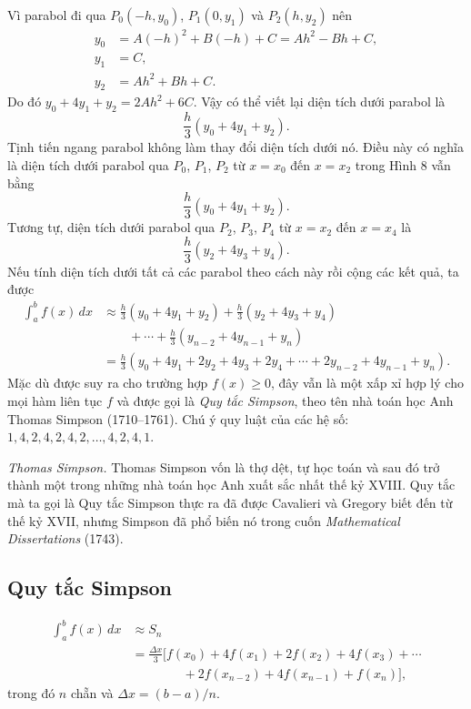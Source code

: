 \documentclass[12pt,a4paper]{article}
\begin{document}
Vì parabol đi qua $P_0(-h,y_0)$, $P_1(0,y_1)$ và $P_2(h,y_2)$ nên
\begin{align*}
y_0&=A(-h)^2+B(-h)+C=Ah^2-Bh+C,\\
y_1&=C,\\
y_2&=Ah^2+Bh+C.
\end{align*}
Do đó $y_0+4y_1+y_2=2Ah^2+6C$. Vậy có thể viết lại diện tích dưới parabol là
\[\frac h3(y_0+4y_1+y_2).\]
Tịnh tiến ngang parabol không làm thay đổi diện tích dưới nó. Điều này có nghĩa là diện tích dưới parabol qua $P_0$, $P_1$, $P_2$ từ $x=x_0$ đến $x=x_2$ trong Hình 8 vẫn bằng
\[\frac h3(y_0+4y_1+y_2).\]
Tương tự, diện tích dưới parabol qua $P_2$, $P_3$, $P_4$ từ $x=x_2$ đến $x=x_4$ là
\[\frac h3(y_2+4y_3+y_4).\]
Nếu tính diện tích dưới tất cả các parabol theo cách này rồi cộng các kết quả, ta được
\begin{align*}
\int_a^b f(x)\,dx&\approx\frac h3(y_0+4y_1+y_2)+\frac h3(y_2+4y_3+y_4)\\
&\qquad+\cdots+\frac h3(y_{n-2}+4y_{n-1}+y_n)\\
&=\frac h3(y_0+4y_1+2y_2+4y_3+2y_4+\cdots+2y_{n-2}+4y_{n-1}+y_n).
\end{align*}
Mặc dù được suy ra cho trường hợp $f(x)\ge0$, đây vẫn là một xấp xỉ hợp lý cho mọi hàm liên tục $f$ và được gọi là \textit{Quy tắc Simpson}, theo tên nhà toán học Anh Thomas Simpson (1710–1761). Chú ý quy luật của các hệ số: $1,4,2,4,2,4,2,\ldots,4,2,4,1$.

\textit{Thomas Simpson.} Thomas Simpson vốn là thợ dệt, tự học toán và sau đó trở thành một trong những nhà toán học Anh xuất sắc nhất thế kỷ XVIII. Quy tắc mà ta gọi là Quy tắc Simpson thực ra đã được Cavalieri và Gregory biết đến từ thế kỷ XVII, nhưng Simpson đã phổ biến nó trong cuốn \textit{Mathematical Dissertations} (1743).

\subsection*{Quy tắc Simpson}
\begin{align*}
\int_a^b f(x)\,dx&\approx S_n\\
&=\frac{\Delta x}{3}[f(x_0)+4f(x_1)+2f(x_2)+4f(x_3)+\cdots\\
&\qquad\qquad+2f(x_{n-2})+4f(x_{n-1})+f(x_n)],
\end{align*}
trong đó $n$ chẵn và $\Delta x=(b-a)/n$.
\end{document}
